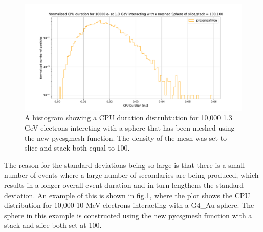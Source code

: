 \documentclass[12pt,a4paper]{article}
\begin{document}

\begin{figure}[h!]
\centering
\includegraphics[scale=0.5]{Images//CPU//pythonhist1.pdf}
\caption[width=\columnwidth]{A histogram showing a CPU duration distrubtution for 10,000 1.3 GeV electrons intercting with a sphere that has been meshed using the new pycsgmesh function. The density of the mesh was set to slice and stack both equal to 100. }
\label{disty}
\end{figure}


\noindent The reason for the standard deviations being so large is that there is a small number of events where a large number of secondaries are being produced, which results in a longer overall event duration and in turn lengthens the standard deviation. An example of this is shown in fig.\ref{disty}, where the plot shows the CPU distribution for 10,000 10 MeV electrons interacting with a G4\_Au sphere. The sphere in this example is constructed using the new pycsgmesh function with a stack and slice both set at 100.
\end{document}
